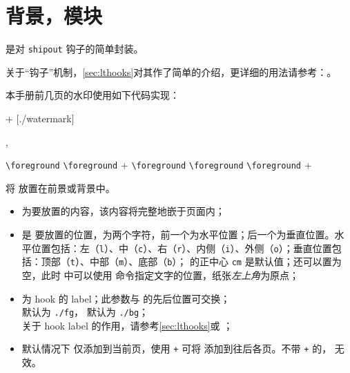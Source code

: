 \documentclass{cusdoc}
\begin{document}
\section{背景，模块}

 是对 \texttt{shipout} 钩子的简单封装。

关于“钩子”机制，\cref{sec:lthooks}对其作了简单的介绍，更详细的用法请参考：。

本手册前几页的水印使用如下代码实现：
\begin{xample}
\background + [./watermark]{%
  }

\removebackground[./watermark]
\stopxamplecode
\xamplecode
\medskip 
\end{xample}

\begin{function}{\foreground,\background}
  \begin{syntax}
    \verb|\foreground|   
    \verb|\foreground| + 
    \verb|\foreground|  
    \verb|\foreground|  
    \verb|\foreground| +   
  \end{syntax}
将  放置在前景或背景中。

\begin{itemize}[nosep]
  \item {} 为要放置的内容，该内容将完整地嵌于页面内；
  \item {} 是  要放置的位置，为两个字符，前一个为水平位置；后一个为垂直位置。水平位置包括：左（\texttt{l}）、中（\texttt{c}）、右（\texttt{r}）、内侧（\texttt{i}）、外侧（\texttt{o}）；垂直位置包括：顶部（\texttt{t}）、中部（\texttt{m}）、底部（\texttt{b}）； 的正中心 \texttt{cm} 是默认值；还可以置为空，此时  中可以使用  命令指定文字的位置，纸张\emph{左上角}为原点；
  \item {} 为 hook 的 label；此参数与  的先后位置可交换；\\ 
   默认为 \texttt{./fg}， 默认为 \texttt{./bg}；\\
  关于 hook label 的作用，请参考\cref{sec:lthooks}或 ；
  \item 默认情况下  仅添加到当前页，使用 \texttt{+} 可将  添加到往后各页。不带 \texttt+ 的， 无效。
\end{itemize}
\end{function}
\end{document}
